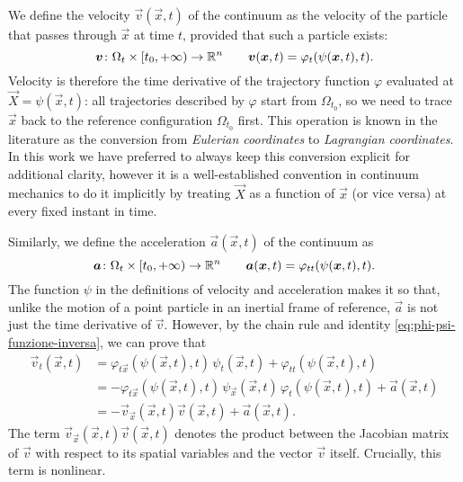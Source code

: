 We define the velocity $\vec{v}(\vec{x},t)$ of the continuum as the
velocity of the particle that passes through $\vec{x}$ at time $t$,
provided that such a particle exists:
\[
\bm{v} \colon \Omega_t \times [t_0,+\infty) \to \mathbb{R}^n
\qquad \bm{v}(\bm{x},t) = \varphi_t(\psi(\bm{x},t),t).
\]
Velocity is therefore the time derivative of the trajectory function $\varphi$
evaluated at $\vec{X} = \psi(\vec{x},t)$: all trajectories described by $\varphi$
start from $\Omega_{t_0}$, so we need to trace $\vec{x}$ back to the reference
configuration $\Omega_{t_0}$ first. This operation is known in the literature as
the conversion from \emph{Eulerian coordinates} to \emph{Lagrangian coordinates}.
In this work we have preferred to always keep this conversion explicit
for additional clarity, however it is a well-established convention in continuum
mechanics to do it implicitly by treating $\vec{X}$ as a function of $\vec{x}$
(or vice versa) at every fixed instant in time.

Similarly, we define the acceleration $\vec{a}(\vec{x},t)$ of the continuum as
\[
\bm{a} \colon \Omega_t \times [t_0,+\infty) \to \mathbb{R}^n
\qquad \bm{a}(\bm{x},t) = \varphi_{tt}(\psi(\bm{x},t),t).
\]
The function $\psi$ in the definitions of velocity and acceleration
makes it so that, unlike the motion of a point particle in an inertial
frame of reference, $\vec{a}$ is not just the time derivative of $\vec{v}$.
However, by the chain rule and identity \eqref{eq:phi-psi-funzione-inversa},
we can prove that
\begin{align} \label{eq:derivata-euleriana-u}
\vec{v}_t(\vec{x},t)
&= \varphi_{t\vec{x}}(\psi(\vec{x},t),t) \, \psi_t(\vec{x},t)
 + \varphi_{tt}(\psi(\vec{x},t),t) \nonumber \\
&= - \varphi_{t\vec{x}}(\psi(\vec{x},t),t) \, \psi_{\vec{x}}(\vec{x},t)
\, \varphi_t(\psi(\vec{x},t),t) + \vec{a}(\vec{x},t) \nonumber \\
&= -\vec{v}_{\vec{x}}(\vec{x},t) \vec{v}(\vec{x},t) + \vec{a}(\vec{x},t).
\end{align}
The term $\vec{v}_{\vec{x}}(\vec{x},t) \vec{v}(\vec{x},t)$ denotes the
product between the Jacobian matrix of $\vec{v}$ with respect to
its spatial variables and the vector $\vec{v}$ itself.
Crucially, this term is nonlinear.

